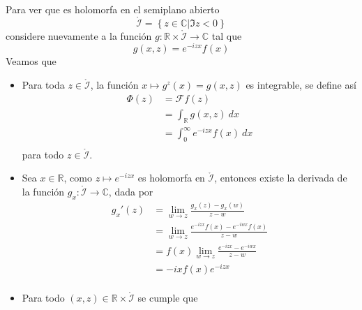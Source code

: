 \documentclass[12pt]{report}
\newcounter{it}
\theoremstyle{largebreak}
\newcommand\cf[3]{\ensuremath{#1:#2\rightarrow#3}}
\newcommand{\fou}[1]{\ensuremath{\mathcal{F}#1}}
\begin{document}
\begin{sol}
        Para ver que es holomorfa en el semiplano abierto
        \begin{equation*}
            \mathring{\mathcal{I}}=\left\{z\in\mathbb{C}\Big|\Im z<0 \right\}
        \end{equation*}
        considere nuevamente a la función $\cf{g}{\mathbb{R}\times\mathring{\mathcal{I}}}{\mathbb{C}}$ tal que
        \begin{equation*}
            g(x,z)=e^{ -izx}f(x)
        \end{equation*}
        Veamos que
        \begin{itemize}
            \item Para toda $z\in\mathring{\mathcal{I}}$, la función $x\mapsto g^z(x)=g(x,z)$ es integrable, se define así
            \begin{equation*}
                \begin{split}
                    \Phi(z)&=\fou{f}(z)\\
                    &=\int_{\mathbb{R}}g(x,z)\:dx\\
                    &=\int_0^{\infty}e^{-izx}f(x)\:dx\\
                \end{split}
            \end{equation*}
            para todo $z\in\mathring{\mathcal{I}}$.
            \item Sea $x\in\mathbb{R}$, como $z\mapsto e^{ -izx}$ es holomorfa en $\mathring{\mathcal{I}}$, entonces existe la derivada de la función $\cf{g_x}{\mathring{\mathcal{I}}}{\mathbb{C}}$, dada por
            \begin{equation*}
                \begin{split}
                    g_x'(z)&=\lim_{ w\rightarrow z}\frac{g_x(z)-g_x(w)}{z-w}\\
                    &=\lim_{ w\rightarrow z}\frac{e^{ -izx}f(x)-e^{ -iwx}f(x)}{z-w}\\
                    &=f(x)\lim_{ w\rightarrow z}\frac{e^{ -izx}-e^{ -iwx}}{z-w}\\
                    &=-ixf(x)e^{ -izx}\\
                \end{split}
            \end{equation*}
            \item Para todo $(x,z)\in\mathbb{R}\times\mathring{\mathcal{I}}$ se cumple que
            \begin{equation*}
                \begin{split}

\end{split}
\end{equation*}
\end{itemize}
\end{sol}
\end{document}
